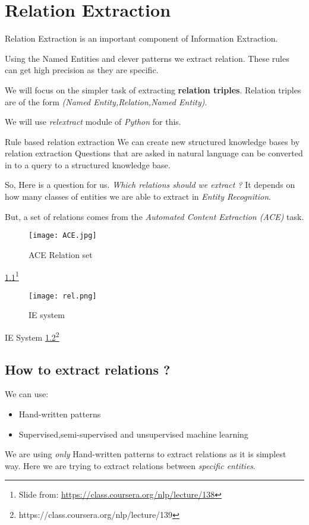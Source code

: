 \documentclass[12pt]{report}
\begin{document}
\chapter{Relation Extraction}
\par Relation Extraction is an important component of Information Extraction.
\par Using the Named Entities and clever patterns we extract relation. These rules can 
get high precision as they are specific.
\par We will focus on the simpler task of extracting \textbf{relation triples}. Relation
triples are of the form \textit{(Named Entity,Relation,Named Entity)}.
\par We will use \textit{relextract} module of \textit{Python} for this.
\par Rule based relation extraction
We can create new structured knowledge bases by relation extraction
Questions that are asked in natural language can be converted in to a query to a structured
knowledge base.\\
\par So, Here is a question for us. \textit{Which relations should we extract ?} It depends
on how many classes of entities we are able to extract in \textit{Entity Recognition}.

But, a set of relations  comes from the \textit{Automated Content Extraction (ACE)} task.
\begin{figure}[htp]
\centering
\texttt{[image: ACE.jpg]}
\caption{ACE Relation set}
\label{ACE}
\end{figure}
\ref{ACE}\footnote{Slide from: \url{https://class.coursera.org/nlp/lecture/138}}
\begin{figure}[htp]
\centering
\texttt{[image: rel.png]}
\caption{IE system}
\label{IE}
\end{figure}

IE System \ref{IE}\footnote{https://class.coursera.org/nlp/lecture/139}

\section{How to extract relations ?}
We can use:
\begin{itemize}
\item Hand-written patterns
\item Supervised,semi-supervised and unsupervised machine learning
\end{itemize}
We are using \textit{only} Hand-written patterns to extract relations as it is simplest
way. Here we are trying to extract relations between \textit{specific entities}. 
\end{document}
